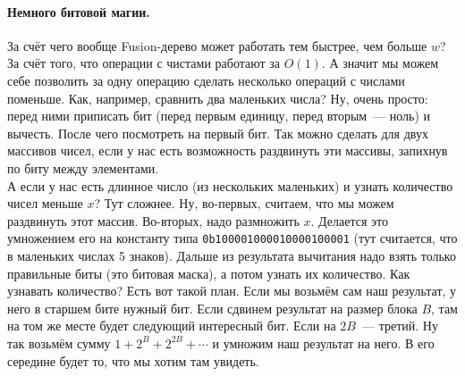 \documentclass{article}
\begin{document}
    \paragraph{Немного битовой магии.}
    За счёт чего вообще Fusion-дерево может работать тем быстрее, чем больше $w$? За счёт того, что операции с чистами работают за $O(1)$. А значит мы можем себе позволить за одну операцию сделать несколько операций с числами поменьше. Как, например, сравнить два маленьких числа? Ну, очень просто: перед ними приписать бит (перед первым единицу, перед вторым~--- ноль) и вычесть. После чего посмотреть на первый бит. Так можно сделать для двух массивов чисел, если у нас есть возможность раздвинуть эти массивы, запихнув по биту между элементами.\\
    А если у нас есть длинное число (из нескольких маленьких) и узнать количество чисел меньше $x$? Тут сложнее. Ну, во-первых, считаем, что мы можем раздвинуть этот массив. Во-вторых, надо размножить $x$. Делается это умножением его на константу типа \texttt{0b100001000010000100001} (тут считается, что в маленьких числах 5 знаков). Дальше из результата вычитания надо взять только правильные биты (это битовая маска), а потом узнать их количество. Как узнавать количество? Есть вот такой план. Если мы возьмём сам наш результат, у него в старшем бите нужный бит. Если сдвинем результат на размер блока $B$, там на том же месте будет следующий интересный бит. Если на $2B$~--- третий. Ну так возьмём сумму $1+2^B+2^{2B}+\cdots$ и умножим наш результат на него. В его середине будет то, что мы хотим там увидеть. 
\end{document}
